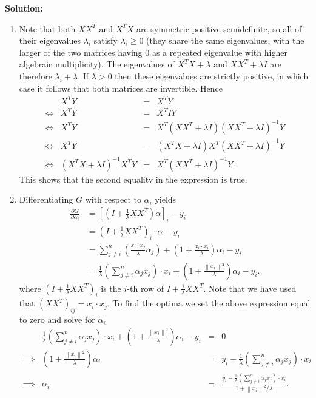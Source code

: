 \documentclass{article}
\newcommand{\solution}{\textbf{\vskip 0.2cm \large Solution:\\}}
\newcommand{\norm}[1]{\left\|#1\right\|}
\begin{document}
\solution
\begin{enumerate}
	\item Note that both $XX^T$ and $X^TX$ are symmetric positive-semidefinite, so all of their eigenvalues $\lambda_i$ satisfy $\lambda_i\geq0$ (they share the same eigenvalues, with the larger of the two matrices having 0 as a repeated eigenvalue with higher algebraic multiplicity). The eigenvalues of $X^TX+\lambda$ and $XX^T + \lambda I$ are therefore $ \lambda_i + \lambda$. If $\lambda>0$ then these eigenvalues are strictly positive, in which case it follows that both matrices are invertible. Hence
	\[
		\begin{array}{crcl}
			&X^TY&=&X^TY \\
			\iff & X^TY &=& X^T I Y \\
			\iff & X^TY &=& X^T(XX^T+\lambda I)(XX^T+\lambda I)^{-1}Y \\
			\iff & X^TY &=& (X^TX+\lambda I)X^T(XX^T+\lambda I)^{-1}Y \\
			\iff & (X^TX+\lambda I)^{-1}X^TY &=& X^T(XX^T+\lambda I)^{-1}Y.
		\end{array}
	\]
	This shows that the second equality in the expression is true.
	\item Differentiating $G$ with respect to $\alpha_i$ yields
	\begin{align*}
		\frac{\partial G}{\partial \alpha_i} &= [(I+\tfrac1\lambda XX^T)\alpha]_i-y_i\\
		&= (I+\tfrac1\lambda XX^T)_i\cdot \alpha - y_i\\
		&= \sum_{j\neq i}^n\left(\frac{x_i\cdot x_j}{\lambda}\alpha_j\right) + \left(1+\frac{x_i\cdot x_i}{\lambda} \right)\alpha_i-y_i\\
		&= \tfrac1\lambda\left(\sum_{j\neq i}^n \alpha_jx_j\right)\cdot x_i + \left(1+\frac{\norm{x_i}^2}{\lambda} \right)\alpha_i-y_i.
	\end{align*}
	where $(I+\tfrac1\lambda XX^T)_i$ is the $i$-th row of $I+\tfrac1\lambda XX^T$. Note that we have used that $(XX^T)_{ij} = x_i\cdot x_j$. To find the optima we set the above expression equal to zero and solve for $\alpha_i$
	\[
		\begin{array}{crcl}
			 &\tfrac1\lambda\left(\sum_{j\neq i}^n \alpha_jx_j\right)\cdot x_i + \left(1+\frac{\norm{x_i}^2}{\lambda} \right)\alpha_i-y_i & = & 0\\
			\implies & \left(1+\frac{\norm{x_i}^2}{\lambda} \right)\alpha_i & = & y_i - \tfrac1\lambda\left(\sum_{j\neq i}^n \alpha_jx_j\right)\cdot x_i \\
			\implies & \alpha_i & = & \frac{y_i - \tfrac1\lambda\left(\sum_{j\neq i}^n \alpha_jx_j\right)\cdot x_i}{1+\norm{x_i}^2/\lambda}.

\end{array}\]
\end{enumerate}
\end{document}
